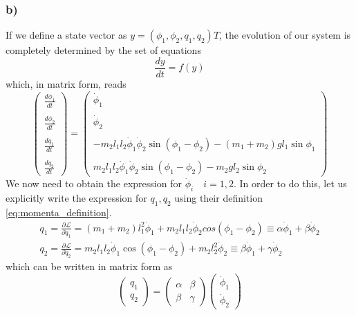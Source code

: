 \documentclass{article}
\begin{document}
\subsubsection*{b)
}If we define a state vector as $y = (\phi_1, \phi_2, q_1, q_2)T$, the evolution of our system is completely 
determined by the set of equations 
\begin{equation*}
    \frac{dy}{dt} = f(y)
\end{equation*}
which, in matrix form, reads
\begin{equation}  
    \begin{pmatrix}
        \frac{d\phi_1}{dt} \\
        \\
        \frac{d\phi_2}{dt} \\
        \\
        \frac{dq_1}{dt} \\
        \\
        \frac{dq_2}{dt}
    \end{pmatrix}
    =
    \begin{pmatrix}
        \dot \phi_1 \\
        \\
        \dot \phi_2 \\
        \\
        -m_2l_1l_2 \dot \phi_1 \dot \phi_2 \sin(\phi_1 - \phi_2) - (m_1 + m_2)gl_1\sin\phi_1 \\
        \\
        m_2l_1l_2 \dot \phi_1 \dot \phi_2 \sin(\phi_1 - \phi_2) - m_2gl_2 \sin \phi_2
    \end{pmatrix}
    \label{eq:diff_eq_matrix_form}
\end{equation}
We now need to obtain the expression for $\dot \phi_i \quad i=1,2$. In order to do this, let us explicitly write the expression for $q_1, q_2$ using their definition \ref{eq:momenta_definition}.
\begin{gather*}
    q_1 = \frac{\partial \mathcal{L}}{\partial \dot q_1} = (m_1 + m_2)l_1^2 \dot \phi_1 + m_2l_1l_2 \dot \phi_2 cos(\phi_1 - \phi_2) \equiv \alpha \dot \phi_1 + \beta \dot \phi_2 \\
    q_2 = \frac{\partial \mathcal{L}}{\partial \dot q_2} = m_2 l_1 l_2 \dot \phi_1 \cos(\phi_1 - \phi_2) + m_2 l_2^2 \dot \phi_2 \equiv \beta \dot \phi_1 + \gamma \dot \phi_2
\end{gather*}
which can be written in matrix form as 
\begin{equation*}
    \begin{pmatrix}
        q_1 \\
        q_2
    \end{pmatrix}
    =
    \begin{pmatrix}
        \alpha & \beta \\
        \beta & \gamma
    \end{pmatrix}
    \begin{pmatrix}
        \dot \phi_1 \\
        \dot \phi_2
    \end{pmatrix}
\end{equation*}
\end{document}

